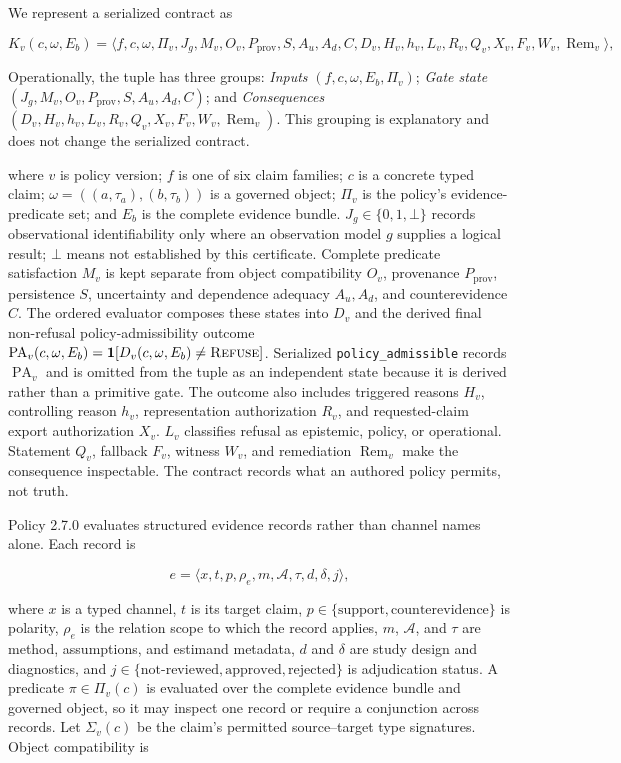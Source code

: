 \documentclass[manuscript,screen,review,anonymous]{acmart}
\begin{document}
We represent a serialized contract as

\begin{equation}
K_v(c,\omega,E_b)=\langle f,c,\omega,\Pi_v,J_g,M_v,O_v,P_{\mathrm{prov}},S,A_u,A_d,C,D_v,H_v,h_v,L_v,R_v,Q_v,X_v,F_v,W_v,\operatorname{Rem}_v\rangle,
\label{eq:contract}
\end{equation}

Operationally, the tuple has three groups: \emph{Inputs} $(f,c,\omega,E_b,\Pi_v)$; \emph{Gate state} $(J_g,M_v,O_v,P_{\mathrm{prov}},S,A_u,A_d,C)$; and \emph{Consequences} $(D_v,H_v,h_v,L_v,R_v,Q_v,X_v,F_v,W_v,\operatorname{Rem}_v)$. This grouping is explanatory and does not change the serialized contract.

where $v$ is policy version; $f$ is one of six claim families; $c$ is a concrete typed claim; $\omega=((a,\tau_a),(b,\tau_b))$ is a governed object; $\Pi_v$ is the policy's evidence-predicate set; and $E_b$ is the complete evidence bundle. $J_g\in\{0,1,\bot\}$ records observational identifiability only where an observation model $g$ supplies a logical result; $\bot$ means not established by this certificate. Complete predicate satisfaction $M_v$ is kept separate from object compatibility $O_v$, provenance $P_{\mathrm{prov}}$, persistence $S$, uncertainty and dependence adequacy $A_u,A_d$, and counterevidence $C$. The ordered evaluator composes these states into $D_v$ and the derived final non-refusal policy-admissibility outcome $\operatorname{PA}_v(c,\omega,E_b)=\mathbf{1}[D_v(c,\omega,E_b)\neq\textsc{Refuse}]$. Serialized \texttt{policy\_admissible} records $\operatorname{PA}_v$ and is omitted from the tuple as an independent state because it is derived rather than a primitive gate. The outcome also includes triggered reasons $H_v$, controlling reason $h_v$, representation authorization $R_v$, and requested-claim export authorization $X_v$. $L_v$ classifies refusal as epistemic, policy, or operational. Statement $Q_v$, fallback $F_v$, witness $W_v$, and remediation $\operatorname{Rem}_v$ make the consequence inspectable. The contract records what an authored policy permits, not truth.

Policy 2.7.0 evaluates structured evidence records rather than channel names alone. Each record is

\begin{equation}
e=\langle x,t,p,\rho_e,m,\mathcal{A},\tau,d,\delta,j\rangle,
\end{equation}

where $x$ is a typed channel, $t$ is its target claim, $p\in\{\mathrm{support},\mathrm{counterevidence}\}$ is polarity, $\rho_e$ is the relation scope to which the record applies, $m$, $\mathcal{A}$, and $\tau$ are method, assumptions, and estimand metadata, $d$ and $\delta$ are study design and diagnostics, and $j\in\{\mathrm{not\mbox{-}reviewed},\mathrm{approved},\mathrm{rejected}\}$ is adjudication status. A predicate $\pi\in\Pi_v(c)$ is evaluated over the complete evidence bundle and governed object, so it may inspect one record or require a conjunction across records. Let $\Sigma_v(c)$ be the claim's permitted source--target type signatures. Object compatibility is
\end{document}
